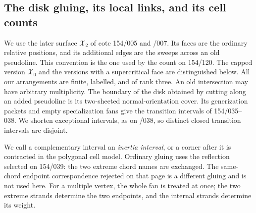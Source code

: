 \documentclass[11pt,a4paper]{article}
\begin{document}
\subsection{The disk gluing, its local links, and its cell counts}

We use the later surface $\mathcal X_2$ of cote 154/005 and /007.
Its faces are the ordinary relative positions, and its additional edges
are the sweeps across an old pseudoline. This convention is the one used
by the count on 154/120. The capped version $\mathcal X_0$ and the versions
with a supercritical face are distinguished below. All our arrangements
are finite, labelled, and of rank three. An old intersection may have
arbitrary multiplicity. The boundary of the disk obtained by cutting
along an added pseudoline is its two-sheeted normal-orientation cover.
Its generization packets and empty specialization fans give the
transition intervals of 154/035--038. We shorten exceptional intervals,
as on /038, so distinct closed transition intervals are disjoint.

We call a complementary interval an \emph{inertia interval}, or a corner
after it is contracted in the polygonal cell model. Ordinary gluing uses
the reflection selected on 154/039: the two extreme chord names are
exchanged. The same-chord endpoint correspondence rejected on that page
is a different gluing and is not used here. For a multiple vertex, the
whole fan is treated at once; the two extreme strands determine the two
endpoints, and the internal strands determine its weight.
\end{document}
